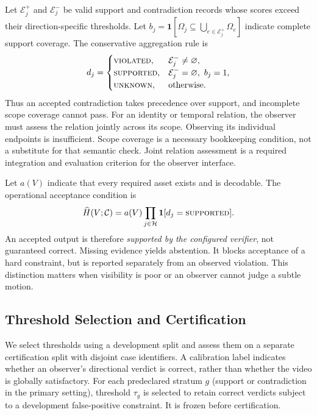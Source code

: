 Let $\mathcal E_j^+$ and $\mathcal E_j^-$ be valid support and contradiction
records whose scores exceed their direction-specific thresholds. Let
$b_j=\mathbf 1[\Omega_j\subseteq\bigcup_{e\in\mathcal E_j^+}\Omega_e]$
indicate complete support coverage. The conservative aggregation rule is
\begin{equation}
 d_j =
 \begin{cases}
 \textsc{violated}, & \mathcal E_j^-\neq\varnothing,\\
 \textsc{supported}, & \mathcal E_j^-=\varnothing,\ b_j=1,\\
 \textsc{unknown}, & \text{otherwise}.
 \end{cases}
 \label{eq:arbitration}
\end{equation}
Thus an accepted contradiction takes precedence over support, and incomplete
scope coverage cannot pass. For an identity or temporal relation, the
observer must assess the relation jointly across its scope. Observing its
individual endpoints is insufficient. Scope coverage is a necessary
bookkeeping condition, not a substitute for that semantic check. Joint
relation assessment is a required integration and evaluation criterion for
the observer interface.

Let $a(V)$ indicate that every required asset exists and is decodable.
The operational acceptance condition is
\begin{equation}
 \widehat H(V;\mathcal C)
 =a(V)
  \prod_{j\in\mathcal H}\mathbf 1[d_j=\textsc{supported}].
 \label{eq:operational-acceptance}
\end{equation}
An accepted output is therefore \emph{supported by the configured verifier},
not guaranteed correct. Missing evidence yields abstention. It blocks
acceptance of a hard constraint, but is reported separately from an observed
violation. This distinction matters when visibility is poor or an observer
cannot judge a subtle motion.

\subsection{Threshold Selection and Certification}
\label{sec:calibration}

We select thresholds using a development split and assess them on a separate
certification split with disjoint case identifiers. A calibration label
indicates whether an observer's directional verdict is correct, rather than
whether the video is globally satisfactory. For each predeclared stratum
$g$ (support or contradiction in the primary setting), threshold $\tau_g$
is selected to retain correct verdicts subject to a development false-positive
constraint. It is frozen before certification.

